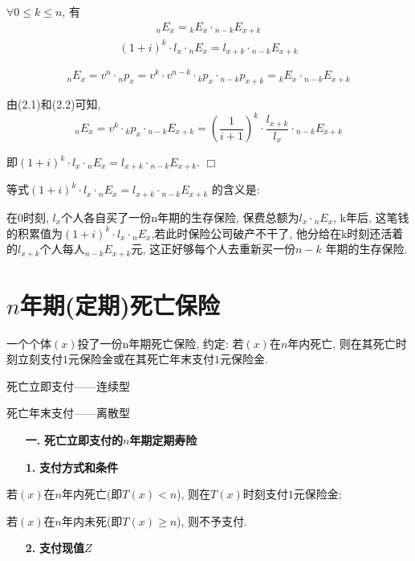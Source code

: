 \documentclass[a4paper,10pt]{ctexbook}
\newcommand{\hei}{\CJKfamily{hei}}      %
\def\qed{\hfill$\Box$\medskip}
\begin{document}
\begin{proposition}
    $\forall 0\leqslant k\leqslant n$, 有
    \begin{align}\label{1}
        _nE_x={}_kE_x\cdot {}_{n-k}E_{x+k}
    \end{align}
    \begin{align}\label{2}
        (1+i)^k\cdot l_x\cdot{}_nE_x=l_{x+k}\cdot {}_{n-k}E_{x+k}
    \end{align}
\end{proposition}
\proof
$$_nE_x=v^n\cdot {}_np_x=v^k\cdot v^{n-k}\cdot {}_kp_x\cdot {}_{n-k}p_{x+k}={}_kE_x\cdot {}_{n-k}E_{x+k}$$

由(2.1)和(2.2)可知,
$$_nE_x=v^k\cdot {}_kp_x\cdot {}_{n-k}E_{x+k}=(\frac{1}{i+1})^k\cdot\frac{l_{x+k}}{l_x}\cdot {}_{n-k}E_{x+k}$$

即$(1+i)^k\cdot l_x\cdot {}_nE_x=l_{x+k}\cdot {}_{n-k}E_{x+k}$.
\qed


\begin{remark}
    等式$(1+i)^k\cdot l_x\cdot {}_nE_x=l_{x+k}\cdot {}_{n-k}E_{x+k}$ 的含义是:

    在0时刻, $l_x$个人各自买了一份n年期的生存保险, 保费总额为$l_x\cdot {}_nE_x$, k年后, 这笔钱的积累值为$(1+i)^k\cdot l_x\cdot {}_nE_x$,若此时保险公司破产不干了, 他分给在k时刻还活着的$l_{x+k}$个人每人$_{n-k}E_{x+k}$元, 这正好够每个人去重新买一份$n-k$ 年期的生存保险.
\end{remark}
\section{$n$年期(定期)死亡保险}

一个个体$(x)$投了一份n年期死亡保险, 约定: 若$(x)$在$n$年内死亡, 则在其死亡时刻立刻支付$1$元保险金或在其死亡年末支付$1$元保险金.

死亡立即支付——连续型

死亡年末支付——离散型
\begin{itemize}
    \item[{\bf\hei 一.}]{\bf\hei 死亡立即支付的$n$年期定期寿险}
\end{itemize}
\begin{itemize}
    \item[{\bf\hei 1.}]{\bf\hei 支付方式和条件}
\end{itemize}

若$(x)$在$n$年内死亡(即$T(x)<n$), 则在$T(x)$时刻支付$1$元保险金;

若$(x)$在$n$年内未死(即$T(x)\geqslant n$), 则不予支付.
\begin{itemize}
    \item[{\bf\hei 2.}]{\bf\hei 支付现值$Z$}
\end{itemize}
\end{document}
